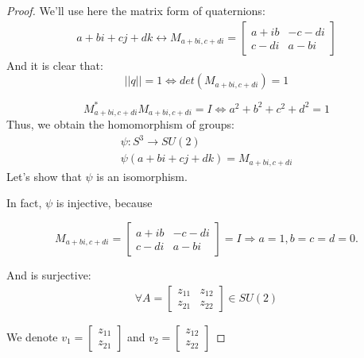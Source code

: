 \begin{proof} \label{proofTeoSU2}
We'll use here the matrix form of quaternions:
\begin{gather*}
    a+bi+cj+dk \leftrightarrow  M_{a+bi,c+di}=\begin{bmatrix}
    a+ib & -c-di\\
    c-di & a-bi
    \end{bmatrix}
\end{gather*}
And it is clear that:
\begin{equation*}
    ||q||=1 \Leftrightarrow det(M_{a+bi,c+di})=1
\end{equation*}

\begin{equation*}
    M_{a+bi,c+di}^{*}M_{a+bi,c+di}=I \Leftrightarrow a^2+b^2+c^2+d^2=1
\end{equation*}
Thus, we obtain the homomorphism of groups:
\begin{gather*}
    \psi: S^3 \rightarrow SU(2)\\
    \psi(a+bi+cj+dk) = M_{a+bi,c+di}
\end{gather*}
Let's show that $\psi$ is an isomorphism.

In fact, $\psi$ is injective, because 

\begin{equation*}
    M_{a+bi,c+di} = \begin{bmatrix}
    a+ib & -c-di\\
    c-di & a-bi
    \end{bmatrix} = I \Rightarrow a=1, b=c=d=0.
\end{equation*}
    
And is surjective:
\begin{gather*}
    \forall A=\begin{bmatrix}
    z_{11} & z_{12}\\
    z_{21} & z_{22}
    \end{bmatrix} \in SU(2)
\end{gather*}

We denote $v_1 = 
\begin{bmatrix}
    z_{11}\\
    z_{21} 
\end{bmatrix} $
and $v_2 = 
\begin{bmatrix}
    z_{12}\\
    z_{22}
\end{bmatrix}$


\end{proof}
